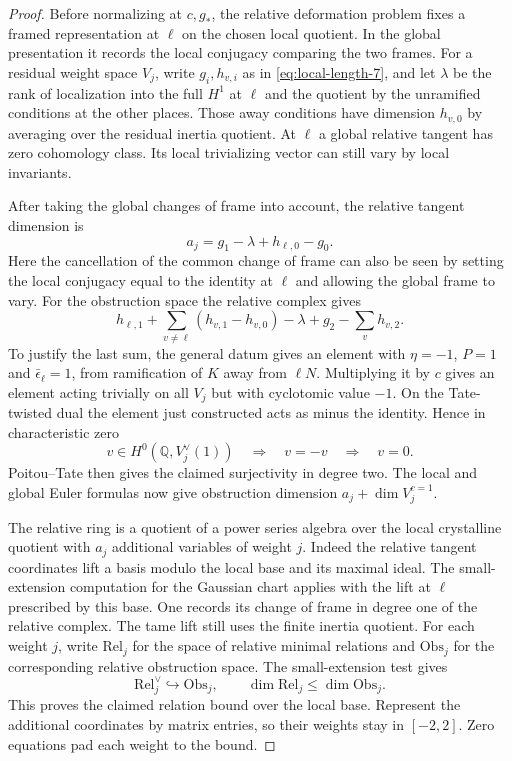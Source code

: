 \begin{proof}
Before normalizing at \(c,g_*\), the relative
deformation problem fixes a framed representation
at \(\ell\) on the chosen local quotient. In the
global presentation it records the local
conjugacy comparing the two frames. For a
residual weight space \(V_j\), write
\(g_i,h_{v,i}\) as in \eqref{eq:local-length-7}, and let \(\lambda\)
be the rank of localization into the full
\(H^1\) at \(\ell\) and the quotient by the
unramified conditions at the other places.
Those away conditions have dimension \(h_{v,0}\)
by averaging over the residual inertia quotient.
At \(\ell\) a global relative tangent has
zero cohomology class. Its local trivializing
vector can still vary by local invariants.

After taking the global changes of frame
into account, the relative tangent dimension is
\[
                a_j=g_1-\lambda+h_{\ell,0}-g_0 .
\]
Here the cancellation of the common change of
frame can also be seen by setting the local
conjugacy equal to the identity at \(\ell\)
and allowing the global frame to vary. For
the obstruction space the relative complex gives
\[
 h_{\ell,1}+\sum_{v\ne\ell}(h_{v,1}-h_{v,0})
                  -\lambda+g_2-\sum_v h_{v,2}.
\]
To justify the last sum, the general datum
gives an element with \(\eta=-1\),
\(P=1\) and \(\bar\epsilon_\ell=1\), from
ramification of \(K\) away from \(\ell N\).
Multiplying it by \(c\) gives an element
acting trivially on all \(V_j\) but with
cyclotomic value \(-1\). On the Tate-twisted dual the element just constructed acts as minus the identity. Hence in characteristic zero
\[
 v\in H^0(\mathbb Q,V_j^\vee(1))\quad\Longrightarrow\quad v=-v\quad\Longrightarrow\quad v=0 .
\]
Poitou--Tate then gives the claimed surjectivity in degree two.
The local and global Euler formulas now give
obstruction dimension \(a_j+\dim V_j^{c=1}\).

The relative ring is a quotient of a power
series algebra over the local crystalline
quotient with \(a_j\) additional variables
of weight \(j\). Indeed the relative tangent
coordinates lift a basis modulo the
local base and its maximal ideal. The
small-extension computation for the Gaussian
chart applies with the lift at \(\ell\)
prescribed by this base. One records its
change of frame in degree one of the
relative complex. The tame lift still
uses the finite inertia quotient.
For each weight \(j\), write \(\mathrm{Rel}_j\) for the space of relative minimal relations and \(\mathrm{Obs}_j\) for the corresponding relative obstruction space. The small-extension test gives
\[
 \mathrm{Rel}_j^\vee\hookrightarrow\mathrm{Obs}_j,\qquad\dim\mathrm{Rel}_j\le\dim\mathrm{Obs}_j .
\] This proves the
claimed relation bound over the local base.
Represent the additional coordinates by
matrix entries, so their weights stay in
\([-2,2]\). Zero equations pad each weight
to the bound.


\end{proof}
